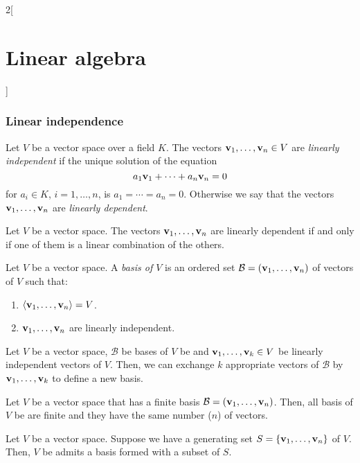 \documentclass[../../../main.tex]{subfiles}
\begin{document}
\begin{multicols}{2}[\section{Linear algebra}]
  \subsubsection{Linear independence}
  \begin{definition}
    Let $V$ be a vector space over a field $K$. The vectors $\boldsymbol{\mathrm{v}}_1,\ldots,\boldsymbol{\mathrm{v}}_n\in V$ are \textit{linearly independent} if the unique solution of the equation $$a_1\boldsymbol{\mathrm{v}}_1+\cdots+a_n\boldsymbol{\mathrm{v}}_n=0$$ for $a_i\in K$, $i=1,\ldots,n$, is $a_1=\cdots=a_n=0$. Otherwise we say that the vectors $\boldsymbol{\mathrm{v}}_1,\ldots,\boldsymbol{\mathrm{v}}_n$ are \textit{linearly dependent}.
  \end{definition}
  \begin{lemma}
    Let $V$ be a vector space. The vectors $\boldsymbol{\mathrm{v}}_1,\ldots,\boldsymbol{\mathrm{v}}_n$ are linearly dependent if and only if one of them is a linear combination of the others.
  \end{lemma}
  \begin{definition}
    Let $V$ be a vector space. A \textit{basis of $V$} is an ordered set $\mathcal{B}=(\boldsymbol{\mathrm{v}}_1,\ldots,\boldsymbol{\mathrm{v}}_n)$ of vectors of $V$ such that:
    \begin{enumerate}
      \item $\langle \boldsymbol{\mathrm{v}}_1,\ldots,\boldsymbol{\mathrm{v}}_n\rangle = V$.
      \item $\boldsymbol{\mathrm{v}}_1,\ldots,\boldsymbol{\mathrm{v}}_n$ are linearly independent.
    \end{enumerate}
  \end{definition}
  \begin{lemma}
    Let $V$ be a vector space, $\mathcal{B}$ be bases of $V$ be and $\boldsymbol{\mathrm{v}}_1,\ldots,\boldsymbol{\mathrm{v}}_k\in V$ be linearly independent vectors of $V$. Then, we can exchange $k$ appropriate vectors of $\mathcal{B}$ by $\boldsymbol{\mathrm{v}}_1,\ldots,\boldsymbol{\mathrm{v}}_k$ to define a new basis.
  \end{lemma}
  \begin{corollary}
    Let $V$ be a vector space that has a finite basis $\mathcal{B}=(\boldsymbol{\mathrm{v}}_1,\ldots,\boldsymbol{\mathrm{v}}_n)$. Then, all basis of $V$ be are finite and they have the same number ($n$) of vectors.
  \end{corollary}
  \begin{lemma}
    Let $V$ be a vector space. Suppose we have a generating set $S=\{\boldsymbol{\mathrm{v}}_1,\ldots,\boldsymbol{\mathrm{v}}_n\}$ of $V$. Then, $V$ be admits a basis formed with a subset of $S$.

\end{lemma}
\end{multicols}
\end{document}

